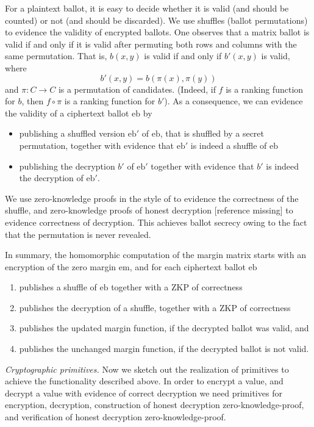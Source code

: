 \documentclass{llncs}
\newcommand{\encb}{\mathrm{eb}}
\newcommand{\encm}{\mathrm{em}}
\begin{document}
For a plaintext ballot, it is easy to decide whether it is
valid (and should be counted) or not (and should be discarded). We
use shuffles (ballot permutations) to evidence the validity of
encrypted ballots. One observes that a matrix ballot is valid if and
only if it is valid after permuting both rows and columns with the
same permutation. That is, $b(x,y)$ is valid if and only if $b'(x,y)$
is valid, where
\[ b'(x,y) = b(\pi(x), \pi(y)) \]
and $\pi: C \to C$ is a permutation of candidates. (Indeed, if $f$
is a ranking function for $b$, then $f \circ \pi$ is a ranking
function for $b'$). As a consequence, we can evidence the validity
of a ciphertext ballot $\encb$ by
\begin{itemize}
  \item publishing a shuffled version $\encb'$ of $\encb$, that is
  shuffled by a secret permutation, together with
  evidence that $\encb'$ is indeed a shuffle of $\encb$
  \item publishing the decryption $b'$ of $\encb'$ together with
  evidence that $b'$ is indeed the decryption of $\encb'$.
\end{itemize}

We use zero-knowledge proofs in the style of \cite{DBLP:conf/africacrypt/TereliusW10}
to evidence the correctness of the shuffle, and zero-knowledge
proofs of honest decryption [reference missing] to evidence
correctness of decryption. This achieves ballot secrecy owing to the
fact that the permutation is never revealed.


In summary, the homomorphic computation of the margin matrix starts
with an encryption of the zero margin $\encm$, and for each
ciphertext ballot $\encb$
\begin{enumerate}
\item publishes a shuffle of $\encb$ together with a ZKP of 
correctness
\item publishes the decryption of a shuffle, together with a ZKP of
correctness
\item publishes the updated margin function, if the decrypted ballot
was valid, and
\item publishes the unchanged margin function, if the decrypted
ballot is not valid.
\end{enumerate}

\smallskip\noindent\emph{Cryptographic primitives.} Now we sketch out the 
realization of primitives to achieve the functionality described above. 
In order to encrypt a value, and decrypt a value with 
evidence of correct decryption we need primitives for encryption, 
decryption, construction of
honest decryption zero-knowledge-proof, and verification of 
honest decryption zero-knowledge-proof.
\end{document}
